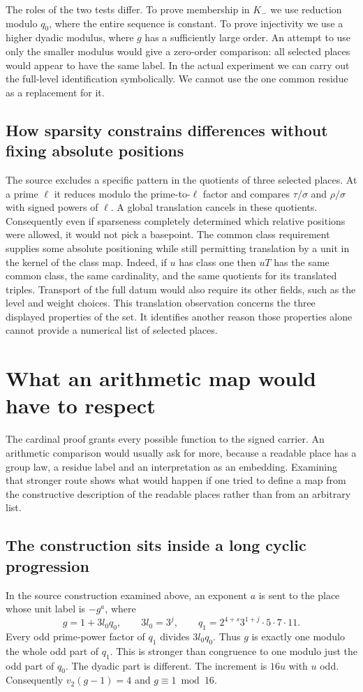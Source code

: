 \documentclass[12pt,letterpaper]{article}
\begin{document}
The roles of the two tests differ. To prove membership in $K_-$ we use reduction modulo $q_0$, where the entire sequence is constant. To prove injectivity we use a higher dyadic modulus, where $g$ has a sufficiently large order. An attempt to use only the smaller modulus would give a zero-order comparison: all selected places would appear to have the same label. In the actual experiment we can carry out the full-level identification symbolically. We cannot use the one common residue as a replacement for it.

\subsection{How sparsity constrains differences without fixing absolute positions}
The source excludes a specific pattern in the quotients of three selected places. At a prime $\ell$ it reduces modulo the prime-to-$\ell$ factor and compares $\tau/\sigma$ and $\rho/\sigma$ with signed powers of $\ell$. A global translation cancels in these quotients. Consequently even if sparseness completely determined which relative positions were allowed, it would not pick a basepoint. The common class requirement supplies some absolute positioning while still permitting translation by a unit in the kernel of the class map. Indeed, if $u$ has class one then $uT$ has the same common class, the same cardinality, and the same quotients for its translated triples. Transport of the full datum would also require its other fields, such as the level and weight choices. This translation observation concerns the three displayed properties of the set. It identifies another reason those properties alone cannot provide a numerical list of selected places.


\section{What an arithmetic map would have to respect}\label{sec:equivariance}
The cardinal proof grants every possible function to the signed carrier. An arithmetic comparison would usually ask for more, because a readable place has a group law, a residue label and an interpretation as an embedding. Examining that stronger route shows what would happen if one tried to define a map from the constructive description of the readable places rather than from an arbitrary list.

\subsection{The construction sits inside a long cyclic progression}
In the source construction examined above, an exponent $a$ is sent to the place whose unit label is $-g^a$, where
\[
          g=1+3l_0q_0,\qquad
          3l_0=3^j,\qquad
          q_1=2^{4+s}3^{1+j}\cdot5\cdot7\cdot11 .
\]
Every odd prime-power factor of $q_1$ divides $3l_0q_0$. Thus $g$ is exactly one modulo the whole odd part of $q_1$. This is stronger than congruence to one modulo just the odd part of $q_0$. The dyadic part is different. The increment is $16u$ with $u$ odd. Consequently $v_2(g-1)=4$ and $g\equiv1\bmod16$.
\end{document}
